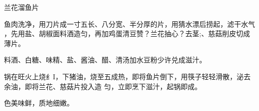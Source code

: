 \begin{recipe}{兰花溜鱼片}

\ingredients


\preparation

\step 鱼肉洗净，用刀片成一寸五长、八分宽、半分厚的片，用猜水漂后捞起，滤干水气
，先用盐、胡椒面料酒造匀，再加鸡蛋清豆赞？兰花抽心？去茎;、慈菇削皮切成薄片。

\step 料酒、白糖、味精、盐、酱油、醋、清汤加水豆粉少许兑成滋汁。

\step 锅在旺火上烧纟I，下猪油，烧至五成热，即将鱼片倒下，用筷子轻轻滑散，泌去
余油，即将兰花、慈菇片投入造 匀，立即烹下滋汁，起锅即成。

\features

色美味鲜，质地细嫩。

\end{recipe}

